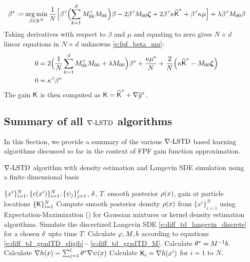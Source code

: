 \begin{equation}
\beta ^* \mathbin{:=}
\mathop{\rm arg{\,}min}_{\beta  \in \mathbb{R}^N} \frac{1}{N} \Bigl[  \beta ^{\hbox{\tiny\it T}} \Bigl( \sum_{k=1}^d M_{0k}^{\hbox{\tiny\it T}} M_{0k} \Bigr) \beta   - 2 \beta ^{\hbox{\tiny\it T}}  M_{00} \boldsymbol{\zeta} + 2 \beta ^{\hbox{\tiny\it T}} \kappa \widehat{\text{\sf K}}^* + \beta ^{\hbox{\tiny\it T}} \kappa \mu  \Bigr]+ \lambda \beta ^{\hbox{\tiny\it T}}  M_{00} \beta
\end{equation}
Taking derivatives with respect to $\beta $ and $\mu $ and equating to zero gives $N+d$ linear equations in $N+d$ unknowns \eqref{e:fpf_beta_mu}:
\begin{equation}
\begin{aligned}
0  &=  2 \Bigl(  \frac{1}{N}  \sum_{k=1}^d M_{0k}^\transpose M_{0k}   +  \lambda M_{00} \Bigr) \beta ^* + \frac{ \kappa \mu ^*}{N}+  \frac{2}{N} \Bigl( \kappa \hakFPF^*  -   M_{00} \boldsymbol{\zeta} \Bigr)  \\
0  & = \kappa^{\transpose} \beta^*
\label{e:fpf_beta_mu}
\end{aligned}
\end{equation}
The gain $\text{\sf K}$ is then computed as
$
\text{\sf K} = \widehat{\text{\sf K}}^* + \nabla \tilde g^*$.

\subsection{Summary of all $\nabla\text{-LSTD}$ algorithms}
In this Section, we provide a summary of the various $\nabla\text{-LSTD}$ based learning algorithms discussed so far in the context of FPF gain function approximation. 

\begin{algorithm}{$\nabla\text{-LSTD}$ algorithm with density estimation and Langevin SDE simulation using a finite dimensional basis}
	\begin{algorithmic}[1]
		\Require $\{x^i\}_{i=1}^N, \{c(x^i)\}_{i=1}^N, \{\psi_j\}_{j=1}^{\ell}$, $\delta$, $T$.
		\Ensure smooth posterior $\rho(x)$, gain at particle locations $\{\text{\sf K}\}_{i=1}^N$
		\State Compute smooth posterior density $\rho(x)$ from $\{x^i\}_{i=1}^N$ using Expectation-Maximization () for Gaussian mixtures or kernel density estimation algorithms.
		\State Simulate the discretized Langevin SDE \eqref{e:diff_td_langevin_discrete} for a chosen $\delta$ upto time $T$.
		\State Calculate $\varphi, M, b$ according to equations \eqref{e:diff_td_gradTD_eligib} - \eqref{e:diff_td_gradTD_M}.
		\State Calculate $\theta^* = M^{-1}b$.
		\State Calculate $\nabla h(x)  =  \sum_{j=1}^{\ell}  \theta^* \nabla \psi(x)$  
		\State Calculate $\text{\sf K}_i = \nabla h(x^i)$ for $i=1$ to $N$. 
	\end{algorithmic}
\end{algorithm} 

